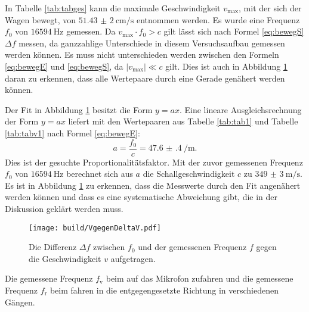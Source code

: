 In Tabelle \ref{tab:tabges} kann die maximale Geschwindigkeit $v_{\text{max}}$, mit der sich der Wagen bewegt, von $\SI{51,43(2)}{\centi\meter\per\second}$ entnommen werden. Es wurde eine Frequenz $f_0$ von $\SI{16594}{\hertz}$ gemessen. 
Da $v_{\text{max}} \cdot f_0 > c$ gilt lässt sich nach Formel \eqref{eq:bewegS} $\Delta f$ messen, da ganzzahlige Unterschiede in diesem Versuchsaufbau gemessen werden können.
Es muss nicht unterschieden werden zwischen den Formeln \eqref{eq:bewegE} und \eqref{eq:bewegS}, da $|v_\text{max}| \ll c$ gilt. Dies ist auch in Abbildung \ref{fig:Graph1} daran zu erkennen, dass alle Wertepaare durch eine Gerade genähert werden können.

Der Fit in Abbildung \ref{fig:Graph1} besitzt die Form $y=a x$. Eine lineare Ausgleichsrechnung der Form $y=a x$ liefert mit den Wertepaaren aus Tabelle \ref{tab:tab1} und Tabelle \ref{tab:tabv1} nach Formel \eqref{eq:bewegE}:
\begin{displaymath}
a = \frac{f_0}{c} = \SI{47.6(4)}{\per\meter}\text{.}
\end{displaymath}
Dies ist der gesuchte Proportionalitätsfaktor. Mit der zuvor gemessenen Frequenz $f_0$ von $\SI{16594}{\hertz}$ berechnet sich aus $a$ die Schallgeschwindigkeit $c$ zu $\SI{349(3)}{\meter\per\second}$.
Es ist in Abbildung \ref{fig:Graph1} zu erkennen, dass die Messwerte durch den Fit angenähert werden können und dass es eine systematische Abweichung gibt, die in der Diskussion geklärt werden muss.
\begin{figure}
	\centering
	\caption{Die Differenz $\Delta f $ zwischen $f_0$ und der gemessenen Frequenz $f$ gegen die Geschwindigkeit $v$ aufgetragen.}
	\texttt{[image: build/VgegenDeltaV.pdf]}
	\label{fig:Graph1}
\end{figure}
\begin{table}
	\caption{Die gemessene Frequenz $f_\text{v}$ beim auf das Mikrofon zufahren und die gemessene Frequenz $f_\text{r}$ beim fahren in die entgegengesetzte Richtung in verschiedenen Gängen.}
	\begin{minipage}{0.5\textwidth}
		\centering
		
	\end{minipage}
	\begin{minipage}{0.5\textwidth}
		\centering
		
	\end{minipage}
\end{table}

